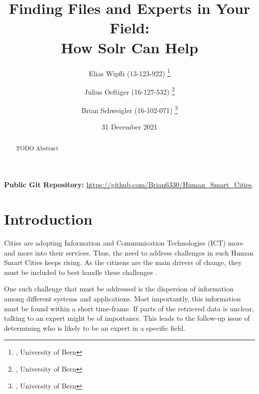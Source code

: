 \documentclass[a4paper,12pt]{article}
\begin{document}

\title{
   Finding Files and Experts in Your Field: \\ 
   \large How Solr Can Help} %


\author{
   Elias Wipfli (13-123-922) 
   \thanks{, University of Bern}
   \and
   Julius Oeftiger (16-127-532) 
   \thanks{, University of Bern}
   \and
   Brian Schweigler (16-102-071)
   \thanks{, University of Bern}
}



\date{31 December 2021} %

\maketitle

\begin{abstract}

TODO Abstract





\end{abstract}

\textbf{Public Git Repository:} \href{https://github.com/Brian6330/Human\_Smart\_Cities}{https://github.com/Brian6330/Human\_Smart\_Cities}.

\tableofcontents
\newpage

\section{Introduction}
Cities are adopting Information and Communication Technologies (ICT) more and more into their services.
Thus, the need to address challenges in such Human Smart Cities keeps rising.
As the citizens are the main drivers of change, they must be included to best handle these challenges \cite{oliveira_smart_2015}.

One such challenge that must be addressed is the dispersion of information among different systems and applications.
Most importantly, this information must be found within a short time-frame.
If parts of the retrieved data is unclear, talking to an expert might be of importance.
This leads to the follow-up issue of determining who is likely to be an expert in a specific field.
\end{document}
